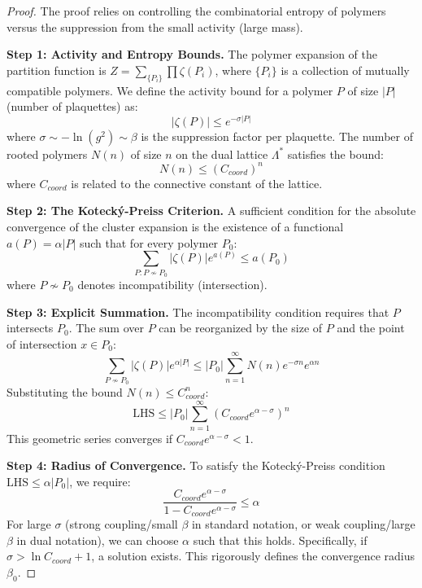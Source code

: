 \begin{proof}
    The proof relies on controlling the combinatorial entropy of polymers versus the suppression from the small activity (large mass).
    
    \textbf{Step 1: Activity and Entropy Bounds.}
    The polymer expansion of the partition function is $Z = \sum_{\{P_i\}} \prod \zeta(P_i)$, where $\{P_i\}$ is a collection of mutually compatible polymers.
    We define the activity bound for a polymer $P$ of size $|P|$ (number of plaquettes) as:
    \begin{equation}
        |\zeta(P)| \le e^{-\sigma |P|}
    \end{equation}
    where $\sigma \sim -\ln(g^2) \sim \beta$ is the suppression factor per plaquette.
    The number of rooted polymers $N(n)$ of size $n$ on the dual lattice $\Lambda^*$ satisfies the bound:
    \begin{equation}
        N(n) \le (C_{coord})^n
    \end{equation}
    where $C_{coord}$ is related to the connective constant of the lattice.

    \textbf{Step 2: The Koteck\'y-Preiss Criterion.}
    A sufficient condition for the absolute convergence of the cluster expansion is the existence of a functional $a(P) = \alpha |P|$ such that for every polymer $P_0$:
    \begin{equation}
        \sum_{P: P \nsim P_0} |\zeta(P)| e^{a(P)} \le a(P_0)
    \end{equation}
    where $P \nsim P_0$ denotes incompatibility (intersection).
    
    \textbf{Step 3: Explicit Summation.}
    The incompatibility condition requires that $P$ intersects $P_0$. The sum over $P$ can be reorganized by the size of $P$ and the point of intersection $x \in P_0$:
    \begin{equation}
        \sum_{P \nsim P_0} |\zeta(P)| e^{\alpha |P|} \le |P_0| \sum_{n=1}^\infty N(n) e^{-\sigma n} e^{\alpha n}
    \end{equation}
    Substituting the bound $N(n) \le C_{coord}^n$:
    \begin{equation}
        \text{LHS} \le |P_0| \sum_{n=1}^\infty (C_{coord} e^{\alpha - \sigma})^n
    \end{equation}
    This geometric series converges if $C_{coord} e^{\alpha - \sigma} < 1$.
    
    \textbf{Step 4: Radius of Convergence.}
    To satisfy the Koteck\'y-Preiss condition $\text{LHS} \le \alpha |P_0|$, we require:
    \begin{equation}
        \frac{C_{coord} e^{\alpha - \sigma}}{1 - C_{coord} e^{\alpha - \sigma}} \le \alpha
    \end{equation}
    For large $\sigma$ (strong coupling/small $\beta$ in standard notation, or weak coupling/large $\beta$ in dual notation), we can choose $\alpha$ such that this holds. Specifically, if $\sigma > \ln C_{coord} + 1$, a solution exists. This rigorously defines the convergence radius $\beta_0$.
\end{proof}


